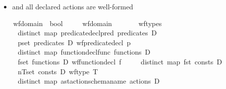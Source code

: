 \begin{isabellebody}
\begin{isamarkuptext}
\begin{itemize}
\item and all declared actions are well-formed%
\end{itemize}%
\end{isamarkuptext}\isamarkuptrue%
\ \ \isamarkupfalse%
\ wf{\isacharunderscore}{\kern0pt}domain\ {\isacharcolon}{\kern0pt}{\isacharcolon}{\kern0pt}\ {\isachardoublequoteopen}bool{\isachardoublequoteclose}\ \isanewline
\ \ \ \ {\isachardoublequoteopen}wf{\isacharunderscore}{\kern0pt}domain\ {\isasymequiv}\isanewline
\ \ \ \ \ \ wf{\isacharunderscore}{\kern0pt}types\isanewline
\ \ \ \ {\isasymand}\ distinct\ {\isacharparenleft}{\kern0pt}map\ {\isacharparenleft}{\kern0pt}predicate{\isacharunderscore}{\kern0pt}decl{\isachardot}{\kern0pt}pred{\isacharparenright}{\kern0pt}\ {\isacharparenleft}{\kern0pt}predicates\ D{\isacharparenright}{\kern0pt}{\isacharparenright}{\kern0pt}\isanewline
\ \ \ \ {\isasymand}\ {\isacharparenleft}{\kern0pt}{\isasymforall}p{\isasymin}set\ {\isacharparenleft}{\kern0pt}predicates\ D{\isacharparenright}{\kern0pt}{\isachardot}{\kern0pt}\ wf{\isacharunderscore}{\kern0pt}predicate{\isacharunderscore}{\kern0pt}decl\ p{\isacharparenright}{\kern0pt}\isanewline
\ \ \ \ {\isasymand}\ distinct\ {\isacharparenleft}{\kern0pt}map\ {\isacharparenleft}{\kern0pt}function{\isacharunderscore}{\kern0pt}decl{\isachardot}{\kern0pt}func{\isacharparenright}{\kern0pt}\ {\isacharparenleft}{\kern0pt}functions\ D{\isacharparenright}{\kern0pt}{\isacharparenright}{\kern0pt}\isanewline
\ \ \ \ {\isasymand}\ {\isacharparenleft}{\kern0pt}{\isasymforall}f{\isasymin}set\ {\isacharparenleft}{\kern0pt}functions\ D{\isacharparenright}{\kern0pt}{\isachardot}{\kern0pt}\ wf{\isacharunderscore}{\kern0pt}function{\isacharunderscore}{\kern0pt}decl\ f{\isacharparenright}{\kern0pt}\isanewline
\ \ \ \ {\isasymand}\ distinct\ {\isacharparenleft}{\kern0pt}map\ fst\ {\isacharparenleft}{\kern0pt}consts\ D{\isacharparenright}{\kern0pt}{\isacharparenright}{\kern0pt}\isanewline
\ \ \ \ {\isasymand}\ {\isacharparenleft}{\kern0pt}{\isasymforall}{\isacharparenleft}{\kern0pt}n{\isacharcomma}{\kern0pt}T{\isacharparenright}{\kern0pt}{\isasymin}set\ {\isacharparenleft}{\kern0pt}consts\ D{\isacharparenright}{\kern0pt}{\isachardot}{\kern0pt}\ wf{\isacharunderscore}{\kern0pt}type\ T{\isacharparenright}{\kern0pt}\isanewline
\ \ \ \ {\isasymand}\ distinct\ {\isacharparenleft}{\kern0pt}map\ ast{\isacharunderscore}{\kern0pt}action{\isacharunderscore}{\kern0pt}schema{\isachardot}{\kern0pt}name\ {\isacharparenleft}{\kern0pt}actions\ D{\isacharparenright}{\kern0pt}{\isacharparenright}{\kern0pt}\isanewline

\end{isabellebody}
